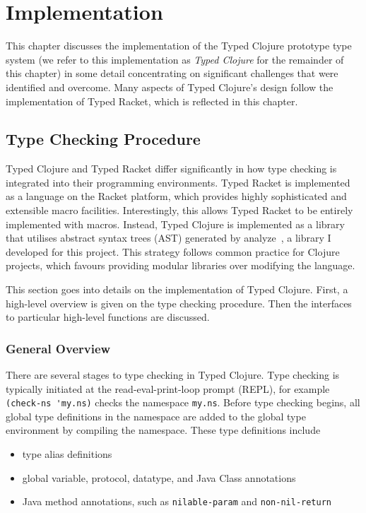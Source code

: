 \chapter{Implementation}

This chapter discusses the implementation of the Typed Clojure prototype type 
system (we refer to this implementation as \emph{Typed Clojure} for the remainder of this chapter)
in some detail concentrating on significant challenges that were identified and overcome.
Many aspects of Typed Clojure's design follow the implementation of Typed Racket,
which is reflected in this chapter.

\section{Type Checking Procedure}

Typed Clojure and Typed Racket differ significantly in how type checking
is integrated into their programming environments.
Typed Racket is implemented as a language on the
Racket platform, which provides highly sophisticated and extensible macro facilities.
Interestingly, this allows Typed Racket to be entirely implemented with macros.
Instead, Typed Clojure is implemented as a library that utilises abstract syntax trees (AST)
generated by analyze~\cite{Analyze2012}, a library I developed for this project.
This strategy follows common practice for Clojure projects, which favours providing modular libraries 
over modifying the language.

This section goes into details on the implementation of Typed Clojure.
First, a high-level overview is given on the type checking procedure.
Then the interfaces to particular high-level functions are discussed.

\subsection{General Overview}

There are several stages to type checking in Typed Clojure.
Type checking is typically initiated at the read-eval-print-loop prompt (REPL),
for example \lstinline|(check-ns 'my.ns)| checks the namespace \lstinline|my.ns|.
Before type checking begins, all global type definitions in the namespace
are added to the global type environment by compiling the namespace.
These type definitions include

\begin{itemize}
  \item type alias definitions
  \item global variable, protocol, datatype, and Java Class annotations
  \item Java method annotations, such as \lstinline|nilable-param| and \lstinline|non-nil-return|
\end{itemize}

